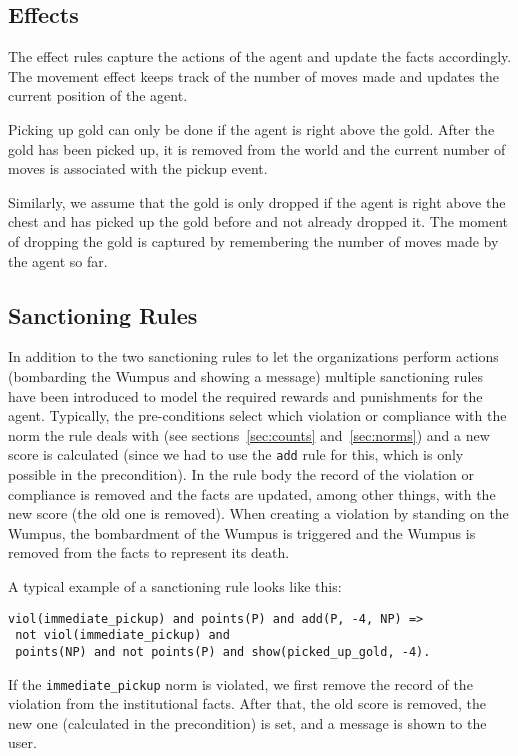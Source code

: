 \documentclass[a4paper,11pt]{article}
\begin{document}
\subsection{Effects}
\label{sec:effects}
The effect rules capture the actions of the agent and update the facts accordingly. The movement effect keeps track of the number of moves made and updates the current position of the agent.

Picking up gold can only be done if the agent is right above the gold. After the gold has been picked up, it is removed from the world and the current number of moves is associated with the pickup event.

Similarly, we assume that the gold is only dropped if the agent is right above the chest and has picked up the gold before and not already dropped it. The moment of dropping the gold is captured by remembering the number of moves made by the agent so far.

\subsection{Sanctioning Rules}
\label{sec:sanct}
In addition to the two sanctioning rules to let the organizations perform actions (bombarding the Wumpus and showing a message) multiple sanctioning rules have been introduced to model the required rewards and punishments for the agent. Typically, the pre-conditions select which violation or compliance with the norm the rule deals with (see sections~\ref{sec:counts} and~\ref{sec:norms}) and a new score is calculated (since we had to use the \texttt{add} rule for this, which is only possible in the precondition). In the rule body the record of the violation or compliance is removed and the facts are updated, among other things, with the new score (the old one is removed). When creating a violation by standing on the Wumpus, the bombardment of the Wumpus is triggered and the Wumpus is removed from the facts to represent its death. 

A typical example of a sanctioning rule looks like this:

\begin{lstlisting}[basicstyle=\footnotesize]
viol(immediate_pickup) and points(P) and add(P, -4, NP) =>
 not viol(immediate_pickup) and 
 points(NP) and not points(P) and show(picked_up_gold, -4).
\end{lstlisting}

If the \texttt{immediate\_pickup} norm is violated, we first remove the record of the violation from the institutional facts. After that, the old score is removed, the new one (calculated in the precondition) is set, and a message is shown to the user.
\end{document}
